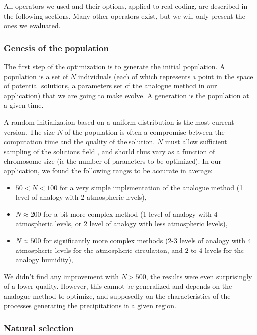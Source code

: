 \documentclass{ametsoc}
\begin{document}
All operators we used and their options, applied to real coding, are described in the following sections. Many other operators exist, but we will only present the ones we evaluated.


\subsubsection{Genesis of the population}

The first step of the optimization is to generate the initial population. A population is a set of $N$ individuals (each of which represents a point in the space of potential solutions, a parameters set of the analogue method in our application) that we are going to make evolve. A generation is the population at a given time. 

A random initialization based on a uniform distribution is the most current version. The size $N$ of the population is often a compromise between the computation time and the quality of the solution. $N$ must allow sufficient sampling of the solutions field \citep{Beasley1996a}, and should thus vary as a function of chromosome size (ie the number of parameters to be optimized). In our application, we found the following ranges to be accurate in average:

\begin{itemize}
	\item $50<N<100$ for a very simple implementation of the analogue method (1 level of analogy with 2 atmospheric levels),
	
	\item $N\approx200$ for a bit more complex method (1 level of analogy with 4 atmospheric levels, or 2 level of analogy with less atmospheric levels),
	
	\item $N\approx500$ for significantly more complex methods (2-3 levels of analogy with 4 atmospheric levels for the atmospheric circulation, and 2 to 4 levels for the analogy humidity),
\end{itemize}

We didn't find any improvement with $N>500$, the results were even surprisingly of a lower quality. However, this cannot be generalized and depends on the analogue method to optimize, and supposedly on the characteristics of the processes generating the precipitations in a given region. 


\subsubsection{Natural selection}
\end{document}
